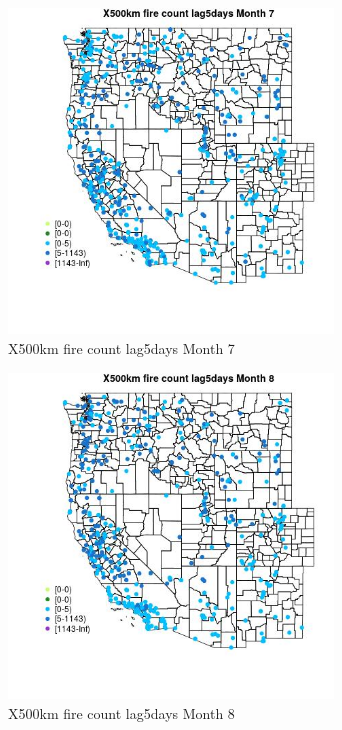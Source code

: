 \begin{figure} 
\centering  
\includegraphics[width=0.77\textwidth]{Code_Outputs/Report_ML_input_PM25_Step4_part_e_de_duplicated_aves_compiled_2019-05-14wNAs_MapObsMo7X500km_fire_count_lag5days.jpg} 
\caption{\label{fig:Report_ML_input_PM25_Step4_part_e_de_duplicated_aves_compiled_2019-05-14wNAsMapObsMo7X500km_fire_count_lag5days}X500km fire count lag5days Month 7} 
\end{figure} 
 

\begin{figure} 
\centering  
\includegraphics[width=0.77\textwidth]{Code_Outputs/Report_ML_input_PM25_Step4_part_e_de_duplicated_aves_compiled_2019-05-14wNAs_MapObsMo8X500km_fire_count_lag5days.jpg} 
\caption{\label{fig:Report_ML_input_PM25_Step4_part_e_de_duplicated_aves_compiled_2019-05-14wNAsMapObsMo8X500km_fire_count_lag5days}X500km fire count lag5days Month 8} 
\end{figure} 
 

